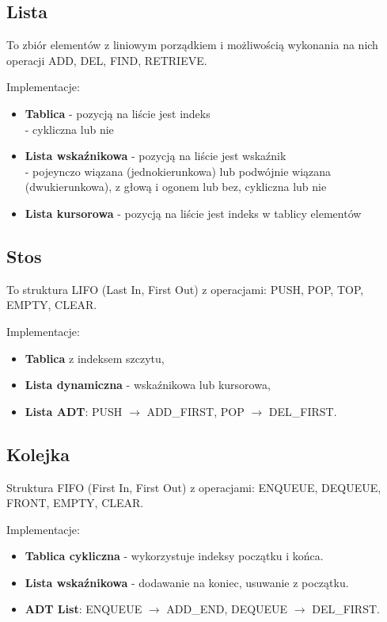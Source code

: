 \subsection*{Lista}
To zbiór elementów z liniowym porządkiem i możliwością wykonania na nich operacji ADD, DEL, FIND, RETRIEVE.

Implementacje:
\begin{itemize}
    \item \textbf{Tablica} - pozycją na liście jest indeks \\
        - cykliczna lub nie
    \item \textbf{Lista wskaźnikowa} - pozycją na liście jest wskaźnik \\
        - pojeynczo wiązana (jednokierunkowa) lub podwójnie wiązana (dwukierunkowa), z głową i ogonem lub bez, cykliczna lub nie
    \item \textbf{Lista kursorowa} - pozycją na liście jest indeks w tablicy elementów
\end{itemize}

\subsection*{Stos}
To struktura LIFO (Last In, First Out) z operacjami: PUSH, POP, TOP, EMPTY, CLEAR.

Implementacje:
\begin{itemize}
    \item \textbf{Tablica} z indeksem szczytu,
    \item \textbf{Lista dynamiczna} - wskaźnikowa lub kursorowa,
    \item \textbf{Lista ADT}: PUSH \( \to \) ADD\_FIRST, POP \( \to \) DEL\_FIRST.
\end{itemize}

\subsection*{Kolejka}
Struktura FIFO (First In, First Out) z operacjami: ENQUEUE, DEQUEUE, FRONT, EMPTY, CLEAR.

Implementacje:
\begin{itemize}
    \item \textbf{Tablica cykliczna} - wykorzystuje indeksy początku i końca.
    \item \textbf{Lista wskaźnikowa} - dodawanie na koniec, usuwanie z początku.
    \item \textbf{ADT List}: ENQUEUE \( \to \) ADD\_END, DEQUEUE \( \to \) DEL\_FIRST.
\end{itemize}

